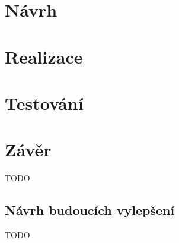 

\chapter{Návrh}



\chapter{Realizace}



\chapter{Testování}



%

\chapter*{Závěr}

TODO

\section*{Návrh budoucích vylepšení}

TODO



































